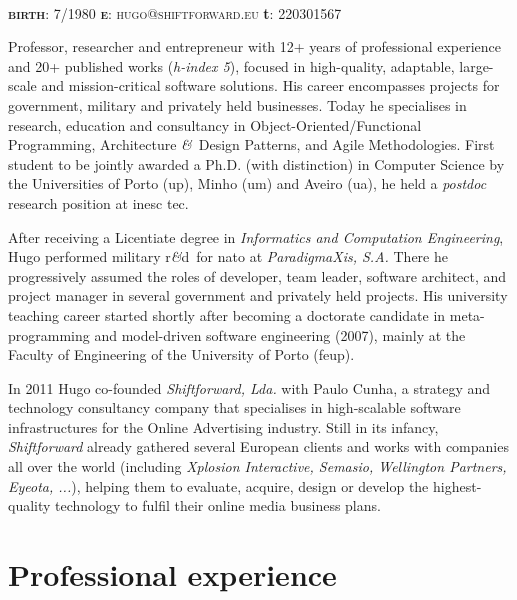 \documentclass[9pt, a4paper]{article}
\newcommand{\amper}{{\fontspec[Scale=.95]{Hoefler Text}\selectfont\itshape\&}}
\newcommand{\marginimage}{
}
\newcommand{\acr}[1]{{\sc #1}}
\newcommand{\rnd}{{\sc r\amper d}~}
\begin{document}

{\huge\sc{}}\\
{\small {\scshape  {\bfseries birth}: 7/1980 \hspace{7.5mm} {\bfseries e}: hugo@shiftforward.eu} \hspace{7mm} {\bfseries t}: 220301567}\\

\marginimage{\small Professor, researcher and entrepreneur with 12+ years of professional experience and 20+ published works (\emph{h-index 5}), focused in high-quality, adaptable, large-scale and mission-critical software solutions. His career encompasses projects for government, military and privately held businesses. Today he specialises in research, education and consultancy in Object-Oriented/Functional Programming, Architecture \amper~Design Patterns, and Agile Methodologies. First student to be jointly awarded a Ph.D. (with distinction) in Computer Science by the Universities of Porto {\sc (up)}, Minho {\sc (um)} and Aveiro {\sc (ua)}, he held a \emph{postdoc} research position at \acr{inesc tec}.

\vspace{1mm}After receiving a Licentiate degree in \emph{Informatics and Computation Engineering}, Hugo performed military \rnd for \acr{nato} at \emph{ParadigmaXis, S.A.} There he progressively assumed the roles of developer, team leader, software architect, and project manager in several government and privately held projects. His university teaching career started shortly after becoming a doctorate candidate in meta-programming and model-driven software engineering (2007), mainly at the Faculty of Engineering of the University of Porto (\acr{feup}).

\vspace{1mm}In 2011 Hugo co-founded \emph{Shiftforward, Lda.} with Paulo Cunha, a strategy and technology consultancy company that specialises in high-scalable software infrastructures for the Online Advertising industry. Still in its infancy, \emph{Shiftforward} already gathered several European clients and works with companies all over the world (including \emph{Xplosion Interactive, Semasio, Wellington Partners, Eyeota, ...}), helping them to evaluate, acquire, design or develop the highest-quality technology to fulfil their online media business plans.}

\section*{Professional experience}
\end{document}
